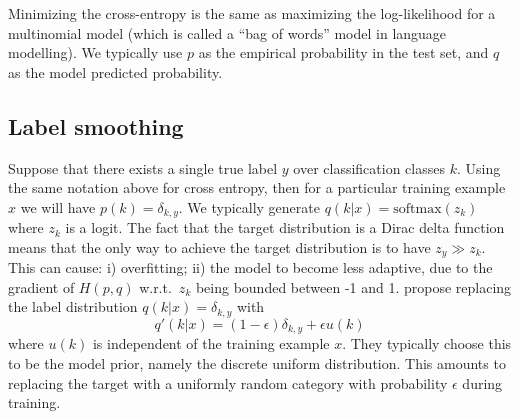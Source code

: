 \documentclass[11pt]{article}
\numberwithin{equation}{section}
\begin{document}
Minimizing the cross-entropy is the same as maximizing the log-likelihood for a multinomial model (which is called a ``bag of words'' model in language modelling). We typically use $p$ as the empirical probability in the test set, and $q$ as the model predicted probability.

\subsection{Label smoothing}
Suppose that there exists a single true label $y$ over classification classes $k$. Using the same notation above for cross entropy, then for a particular training example $x$ we will have $p(k)=\delta_{k,y}$. We typically generate $q(k|x)= \text{softmax}(z_k)$ where $z_k$ is a logit. The fact that the target distribution is a Dirac delta function means that the only way to achieve the target distribution is to have $z_y \gg z_k$. This can cause: i) overfitting; ii) the model to become less adaptive, due to the gradient of $H(p,q)$ w.r.t.\ $z_k$ being bounded between -1 and 1. \cite{Szegedy16} propose replacing the label distribution $q(k|x)=\delta_{k,y}$ with
\begin{equation}
q'(k|x) = (1-\epsilon) \delta_{k,y} + \epsilon u(k)
\end{equation}
where $u(k)$ is independent of the training example $x$. They typically choose this to be the model prior, namely the discrete uniform distribution. This amounts to replacing the target with a uniformly random category with probability $\epsilon$ during training. 


\newpage
 
\end{document}
